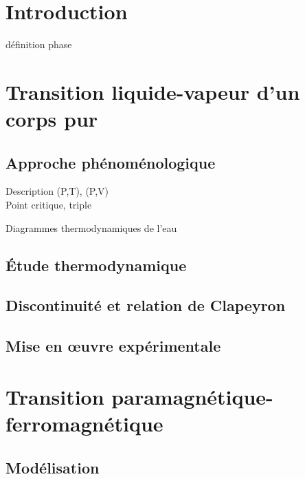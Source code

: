 


\biblio{}

\section*{Introduction}
définition phase

\section{Transition liquide-vapeur d'un corps pur}
\subsection{Approche phénoménologique}

Description (P,T), (P,V) \\
Point critique, triple

\begin{ecran}
	Diagrammes thermodynamiques de l'eau
\end{ecran}

\subsection{Étude thermodynamique}
\subsection{Discontinuité et relation de Clapeyron}
\subsection{Mise en œuvre expérimentale}

\section{Transition paramagnétique-ferromagnétique}
\subsection{Modélisation}
